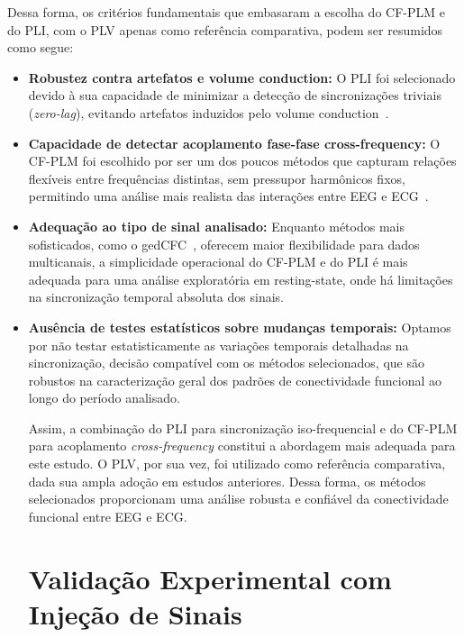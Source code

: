 Dessa forma, os critérios fundamentais que embasaram a escolha do CF-PLM e do PLI, com o PLV apenas como referência comparativa, podem ser resumidos como segue:

\begin{itemize}
  \item \textbf{Robustez contra artefatos e volume conduction:} O PLI foi selecionado devido à sua capacidade de minimizar a detecção de sincronizações triviais (\textit{zero-lag}), evitando artefatos induzidos pelo volume conduction~\cite{seraj2018cerebral, zhang2014phase}.
  
  \item \textbf{Capacidade de detectar acoplamento fase-fase cross-frequency:} O CF-PLM foi escolhido por ser um dos poucos métodos que capturam relações flexíveis entre frequências distintas, sem pressupor harmônicos fixos, permitindo uma análise mais realista das interações entre EEG e ECG~\cite{sorrentino2022detection, seraj2018cerebral, chen2023multiple}.

  \item \textbf{Adequação ao tipo de sinal analisado:} Enquanto métodos mais sofisticados, como o gedCFC~\cite{cohen2017where}, oferecem maior flexibilidade para dados multicanais, a simplicidade operacional do CF-PLM e do PLI é mais adequada para uma análise exploratória em resting-state, onde há limitações na sincronização temporal absoluta dos sinais.

  \item \textbf{Ausência de testes estatísticos sobre mudanças temporais:} Optamos por não testar estatisticamente as variações temporais detalhadas na sincronização, decisão compatível com os métodos selecionados, que são robustos na caracterização geral dos padrões de conectividade funcional ao longo do período analisado.

Assim, a combinação do PLI para sincronização iso-frequencial e do CF-PLM para acoplamento \textit{cross-frequency} constitui a abordagem mais adequada para este estudo. O PLV, por sua vez, foi utilizado como referência comparativa, dada sua ampla adoção em estudos anteriores. Dessa forma, os métodos selecionados proporcionam uma análise robusta e confiável da conectividade funcional entre EEG e ECG.


\section{Validação Experimental com Injeção de Sinais}


\end{itemize}
